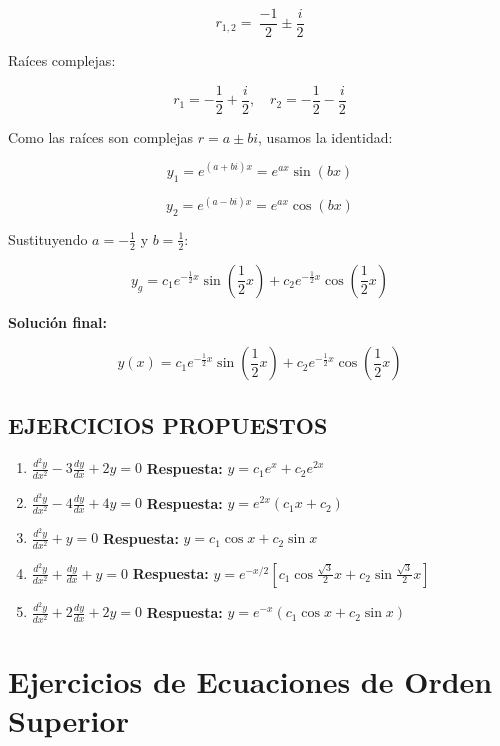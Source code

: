 \[
r_{1,2} =\ \frac{-1}{2} \pm \frac{i}{2}
\]

Raíces complejas:

\[
r_{1} = -\frac{1}{2} + \frac{i}{2}, \quad r_{2} = -\frac{1}{2} - \frac{i}{2}
\]

Como las raíces son complejas \( r = a \pm bi \), usamos la identidad:

\[
y_1 = e^{(a+bi)x} = e^{ax} \sin(bx)
\]

\[
y_2 = e^{(a-bi)x} = e^{ax} \cos(bx)
\]

Sustituyendo \( a = -\frac{1}{2} \) y \( b = \frac{1}{2} \):

\[
y_{g} = c_{1} e^{-\frac{1}{2} x} \sin\left(\frac{1}{2} x\right) + c_{2} e^{-\frac{1}{2} x} \cos\left(\frac{1}{2} x\right)
\]

\textbf{Solución final:}

\[
y(x) = c_{1} e^{-\frac{1}{2} x} \sin\left(\frac{1}{2} x\right) + c_{2} e^{-\frac{1}{2} x} \cos\left(\frac{1}{2} x\right)
\]

\subsection*{EJERCICIOS PROPUESTOS}

\begin{enumerate}
    \item \( \frac{d^2 y}{dx^2} - 3 \frac{dy}{dx} + 2y = 0 \)  
    \textbf{Respuesta:} \( y = c_1 e^x + c_2 e^{2x} \)

    \item \( \frac{d^2 y}{dx^2} - 4 \frac{dy}{dx} + 4y = 0 \)  
    \textbf{Respuesta:} \( y = e^{2x} (c_1 x + c_2) \)

    \item \( \frac{d^2 y}{dx^2} + y = 0 \)  
    \textbf{Respuesta:} \( y = c_1 \cos x + c_2 \sin x \)

    \item \( \frac{d^2 y}{dx^2} + \frac{dy}{dx} + y = 0 \)  
    \textbf{Respuesta:} \( y = e^{-x/2} \left[ c_1 \cos \frac{\sqrt{3}}{2} x + c_2 \sin \frac{\sqrt{3}}{2} x \right] \)

    \item \( \frac{d^2 y}{dx^2} + 2 \frac{dy}{dx} + 2y = 0 \)  
    \textbf{Respuesta:} \( y = e^{-x} (c_1 \cos x + c_2 \sin x) \)
\end{enumerate}

\section{Ejercicios de Ecuaciones de Orden Superior}

